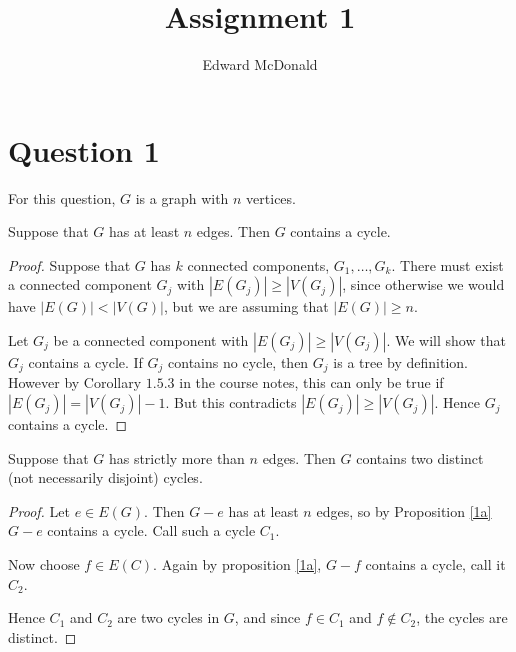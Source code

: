 \documentclass{unswmaths}
\begin{document}
\subject{MATH5425 - Graph Theory}
\author{Edward McDonald}
\title{Assignment 1}


\setlength\parindent{0pt}


\newcommand{\bd}{\boldsymbol{d}}

\unswtitle{}

\section*{Question 1}
For this question, $G$ is a graph with $n$ vertices.
\begin{proposition}[Part (a)]
\label{1a}
    Suppose that $G$ has at least $n$ edges. Then $G$ contains a cycle.
\end{proposition}
\begin{proof}
    Suppose that $G$ has $k$ connected components, $G_1,\ldots,G_k$.
    There must exist a connected component $G_j$
    with $|E(G_j)| \geq |V(G_j)|$, since otherwise we
    would have $|E(G)| < |V(G)|$, but we are assuming
    that $|E(G)| \geq n$. 
    
    Let $G_j$ be a connected component with $|E(G_j)| \geq |V(G_j)|$.
    We will show that $G_j$ contains a cycle. If $G_j$ contains
    no cycle, then $G_j$ is a tree by definition. However by Corollary
    $1.5.3$ in the course notes, this can only be true if $|E(G_j)| = |V(G_j)|-1$.
    But this contradicts $|E(G_j)| \geq |V(G_j)|$. Hence $G_j$ contains a cycle.
\end{proof}

\begin{proposition}[Part (b)]
\label{1b}
    Suppose that $G$ has strictly more than $n$ edges. Then $G$ contains
    two distinct (not necessarily disjoint) cycles.
\end{proposition}
\begin{proof}
    Let $e \in E(G)$. Then $G - e$ has at least $n$ edges, so by Proposition \ref{1a}
    $G-e$ contains a cycle. Call such a cycle $C_1$.
    
    Now choose $f \in E(C)$. Again by proposition \ref{1a}, $G-f$ contains
    a cycle, call it $C_2$.
    
    Hence $C_1$ and $C_2$ are two cycles in $G$, and since $f \in C_1$
    and $f \notin C_2$, the cycles are distinct.
\end{proof}
\end{document}
